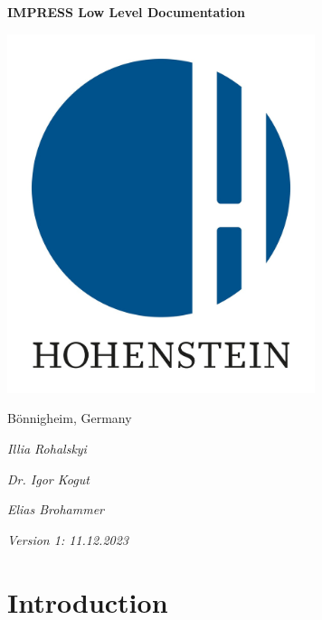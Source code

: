 \documentclass{report}
\begin{document}
\begin{titlepage}
    \centerline{\Huge\textbf{IMPRESS Low Level Documentation}}
    
    \vspace*{1cm}
    
    \centerline{\includegraphics[width=9cm]{hohenstein logo.jpg}}
    
    \vspace*{1.5cm}
    
    \centerline{\LARGE Bönnigheim, Germany}
    
    \vspace*{1cm}
    
    \centerline{\Large\textit{Illia Rohalskyi}}

    \vspace*{0.2cm}
    
    \centerline{\Large\textit{Dr. Igor Kogut}}

    \vspace*{0.2cm}
    
    \centerline{\Large\textit{Elias Brohammer}}
    
    \vspace*{1cm}
    
    \centerline{\Large\textit{Version 1: 11.12.2023}}
    
\end{titlepage}


\tableofcontents
\chapter{Introduction}
\end{document}
